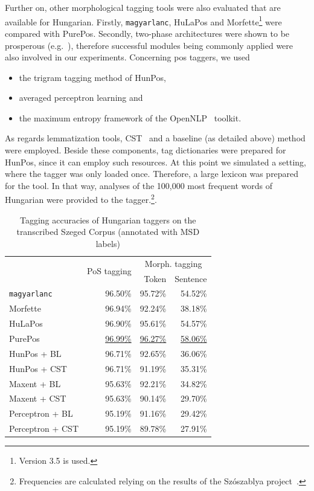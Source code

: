Further on, other morphological tagging tools were also evaluated that are available for Hungarian. 
Firstly, \texttt{magyarlanc}, HuLaPos and Morfette\footnote{Version 3.5 is used.} were compared with PurePos.  
Secondly, two-phase architectures were shown to be prosperous (e.g.~\cite{Agic2013,Erjavec2004}), therefore successful modules being commonly applied were also involved in our experiments. 
Concerning \gls{pos} taggers, we used
\begin{itemize}
  \item the trigram tagging method of HunPos,
  \item averaged perceptron learning and
  \item the maximum entropy framework of the OpenNLP~\cite{Baldridge2002} toolkit.
\end{itemize}

As regards lemmatization tools, CST~\cite{Jongejan} and a baseline (as detailed above) method were employed. 
Beside these components, tag dictionaries were prepared for HunPos, since it can employ such resources.  
At this point we simulated a setting, where the tagger was only loaded once.
Therefore, a large lexicon was prepared for the tool.
In that way, analyses of the 100,000 most frequent words of Hungarian were provided to the tagger.\footnote{Frequencies are calculated relying on the results of the Szószablya project~\cite{Halacsy2004}.}.


\begin{table}[H]
 \centering
 \caption{Tagging accuracies of Hungarian taggers on the transcribed Szeged Corpus (annotated with MSD labels)}
\begin{tabular}{l r r r}
  \hline
   & \multirow{2}{*}{PoS tagging} & \multicolumn{2}{c}{Morph. tagging} \\
   & &  Token &  Sentence \\
  \hline
  \texttt{magyarlanc} &  96.50\% &  95.72\% &  54.52\% \\
  Morfette &  96.94\% &  92.24\% &  38.18\% \\
  HuLaPos &  96.90\% &   95.61\% & 54.57\% \\
  PurePos &  \underline{96.99\%} &  \underline{96.27\%} &  \underline{58.06\%} \\
  HunPos + BL &  96.71\% &  92.65\% &  36.06\% \\
  HunPos + CST &  96.71\% &  91.19\% &  35.31\% \\
  Maxent + BL &  95.63\% &  92.21\% &  34.82\% \\
  Maxent + CST &  95.63\% &  90.14\% &  29.70\% \\
  Perceptron + BL &  95.19\% &  91.16\% &  29.42\% \\
  Perceptron + CST &  95.19\% &  89.78\% &  27.91\% \\
  \hline
\end{tabular}
\label{tab:morphtag-orig}
\end{table}


